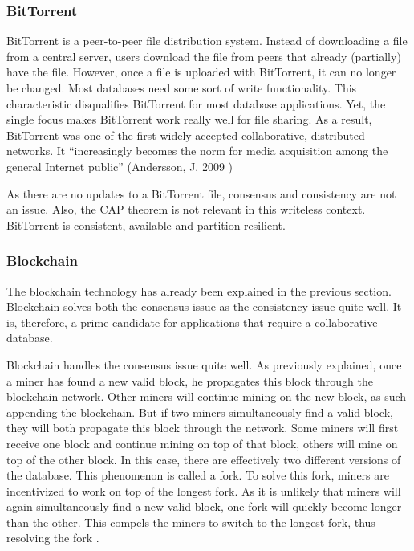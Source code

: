 \subsubsection{BitTorrent}

BitTorrent is a peer-to-peer file distribution system. Instead of downloading a file from a central server, users download the file from peers that already (partially) have the file. However, once a file is uploaded with BitTorrent, it can no longer be changed. Most databases need some sort of write functionality. This characteristic disqualifies BitTorrent for most database applications. Yet, the single focus makes BitTorrent work really well for file sharing. As a result, BitTorrent was one of the first widely accepted collaborative, distributed networks. It ``increasingly becomes the norm for media acquisition among the general Internet public'' (Andersson, J. 2009 \cite{bittorrent-norm})

As there are no updates to a BitTorrent file, consensus and consistency are not an issue. Also, the CAP theorem is not relevant in this writeless context. BitTorrent is consistent, available and partition-resilient.

\subsubsection{Blockchain}

The blockchain technology has already been explained in the previous section. Blockchain solves both the consensus issue as the consistency issue quite well. It is, therefore, a prime candidate for applications that require a collaborative database.

Blockchain handles the consensus issue quite well. As previously explained, once a miner has found a new valid block, he propagates this block through the blockchain network. Other miners will continue mining on the new block, as such appending the blockchain. But if two miners simultaneously find a valid block, they will both propagate this block through the network. Some miners will first receive one block and continue mining on top of that block, others will mine on top of the other block. In this case, there are effectively two different versions of the database. This phenomenon is called a fork. To solve this fork, miners are incentivized to work on top of the longest fork. As it is unlikely that miners will again simultaneously find a new valid block, one fork will quickly become longer than the other. This compels the miners to switch to the longest fork, thus resolving the fork \cite{antonopoulos:2014}. 

